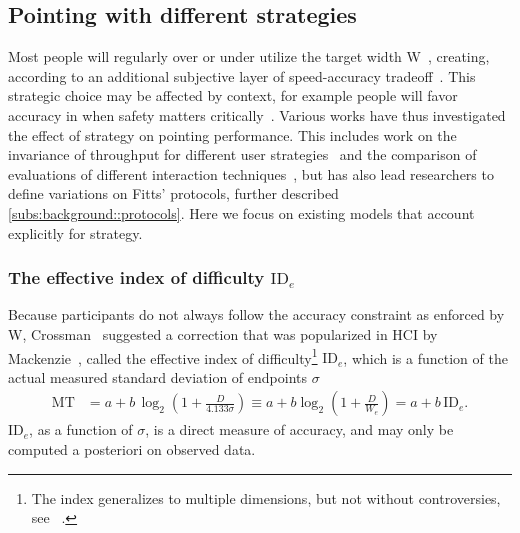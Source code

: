 \documentclass[acmlarge, manuscript,review]{acmart}
\newcommand{\mt}{\ensuremath{{\text{MT}}}\xspace}
\newcommand{\ide}{\ensuremath{{\text{ID}_e}}\xspace}
\begin{document}
\subsection{Pointing with different strategies}
Most people will regularly over or under utilize the target width W~\cite{soukoreff2004}, creating, according to \citeauthor{zhai2004nominal} an additional subjective layer of speed-accuracy tradeoff~\cite{zhai2004nominal}. This strategic choice may be affected by context, for example people will favor accuracy in when safety matters critically~\cite{guiard2011b}.
Various works have thus investigated the effect of strategy on pointing performance. This includes work on the invariance of throughput for different user strategies~\cite{mackenzie2008,olafsdottir2012,batmaz2022} and the comparison of evaluations of different interaction techniques~\cite{yamanaka2023}, but has also lead researchers to define variations on Fitts' protocols, further described \autoref{subs:background::protocols}. Here we focus on existing models that account explicitly for strategy.
\subsubsection{The effective index of difficulty \ide}
Because participants do not always follow the accuracy constraint as enforced by W, Crossman~\cite{crossman1957} suggested a correction that was popularized in HCI by Mackenzie~\cite{soukoreff2004, gori2018tochi}, called the effective index of difficulty\footnote{The index generalizes to multiple dimensions, but not without controversies, see \eg~\cite{wobbrock2011,mackenzie1992,gori2023}.}
\ide, which is a function of the actual measured standard deviation of endpoints $\sigma$
\begin{align}
	\mt & = a + b\,\log_2 \left(1 + \frac{D}{4.133\sigma}\right)                       \equiv a + b \log_2 \left(1 + \frac{D}{W_e}\right)= a + b\,\text{ID}_e        . \label{eq:ide}
\end{align}
ID$_e$, as a function of $\sigma$, is a direct measure of accuracy, and may only be computed a posteriori on observed data.
\end{document}
